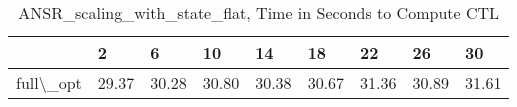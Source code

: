 \begin{table}
\centering
\caption{ANSR\_scaling\_with\_state\_flat, Time in Seconds to Compute CTL}
\label{ANSR_scaling_with_state_flat_CTL_time}
\begin{tabular}{lllllllll}
\toprule
{} &      2 &      6 &     10 &     14 &     18 &     22 &     26 &     30 \\
\midrule
full\textbackslash \_opt &  29.37 &  30.28 &  30.80 &  30.38 &  30.67 &  31.36 &  30.89 &  31.61 \\
\bottomrule
\end{tabular}
\end{table}
